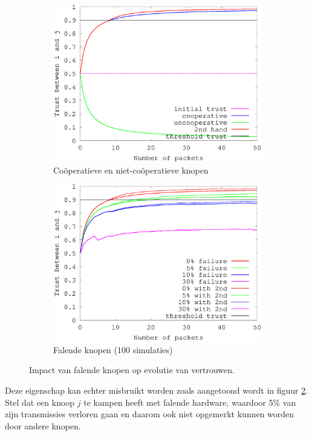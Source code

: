 \begin{figure}[h]
\centering
\begin{subfigure}{.49\textwidth}
  \centering
  \includegraphics[width=.9\linewidth]{./resources/reputation-paper.eps}
  \caption{Co\"operatieve en niet-co\"operatieve knopen}
  \label{fig:reputation-paper}
\end{subfigure}
\begin{subfigure}{.49\textwidth}
  \centering
  \includegraphics[width=.9\linewidth]{./resources/reputation-with-failure.eps}
  \caption{Falende knopen (100 simulaties)}
  \label{fig:reputation-with-failure}
\end{subfigure}
\caption{Impact van falende knopen op evolutie van vertrouwen.}
\label{fig:reputation-paper-with-failure}
\end{figure}

Deze eigenschap kan echter misbruikt worden zoals aangetoond wordt in figuur
\ref{fig:reputation-with-failure}. Stel dat een knoop $j$ te kampen heeft met
falende hardware, waardoor 5\% van zijn transmissies verloren gaan en daarom
ook niet opgemerkt kunnen worden door andere knopen.

